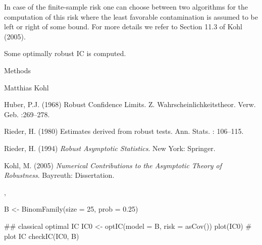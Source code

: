 \begin{Details}\relax
In case of the finite-sample risk  one can choose
between two algorithms for the computation of this risk where the least favorable
contamination is assumed to be left or right of some bound. For more details
we refer to Section 11.3 of Kohl (2005).
\end{Details}
\begin{Value}
Some optimally robust IC is computed.
\end{Value}
\begin{Section}{Methods}
\end{Section}
\begin{Author}\relax
Matthias Kohl 
\end{Author}
\begin{References}\relax
Huber, P.J. (1968) Robust Confidence Limits. Z. Wahrscheinlichkeitstheor.
Verw. Geb. :269--278.

Rieder, H. (1980) Estimates derived from robust tests. Ann. Stats. : 106--115.

Rieder, H. (1994) \emph{Robust Asymptotic Statistics}. New York: Springer.

Kohl, M. (2005) \emph{Numerical Contributions to the Asymptotic Theory of Robustness}. 
Bayreuth: Dissertation.
\end{References}
\begin{SeeAlso}\relax
{}, 
\end{SeeAlso}
\begin{Examples}
\begin{ExampleCode}
B <- BinomFamily(size = 25, prob = 0.25) 

## classical optimal IC
IC0 <- optIC(model = B, risk = asCov())
plot(IC0) # plot IC
checkIC(IC0, B)
\end{ExampleCode}
\end{Examples}


